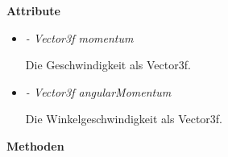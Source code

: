             \textbf{Attribute}
            \begin{itemize}
                \item \textit{- Vector3f momentum}
                    \begin{leftbar}[0.9\linewidth]
                        Die Geschwindigkeit als Vector3f.
                    \end{leftbar}
                \item \textit{- Vector3f angularMomentum}
                    \begin{leftbar}[0.9\linewidth]
                        Die Winkelgeschwindigkeit als Vector3f.
                    \end{leftbar}
            \end{itemize}

            \textbf{Methoden}
